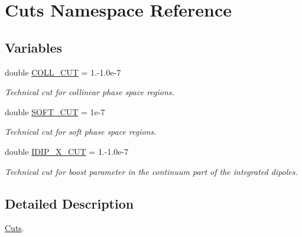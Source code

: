 \hypertarget{namespaceCuts}{}\section{Cuts Namespace Reference}
\label{namespaceCuts}
\subsection*{Variables}
\begin{DoxyCompactItemize}
\item 
\hypertarget{namespaceCuts_aac32d5f86a762f4aeb4f5f07a9accdba}{}double \hyperlink{namespaceCuts_aac32d5f86a762f4aeb4f5f07a9accdba}{C\+O\+L\+L\+\_\+\+C\+U\+T} = 1.-\/1.\+0e-\/7\label{namespaceCuts_aac32d5f86a762f4aeb4f5f07a9accdba}

\begin{DoxyCompactList}\small\item\em Technical cut for collinear phase space regions. \end{DoxyCompactList}\item 
\hypertarget{namespaceCuts_ab5b6f8f12059d55ffb68f56fecc10d65}{}double \hyperlink{namespaceCuts_ab5b6f8f12059d55ffb68f56fecc10d65}{S\+O\+F\+T\+\_\+\+C\+U\+T} = 1e-\/7\label{namespaceCuts_ab5b6f8f12059d55ffb68f56fecc10d65}

\begin{DoxyCompactList}\small\item\em Technical cut for soft phase space regions. \end{DoxyCompactList}\item 
\hypertarget{namespaceCuts_a4a86c8447ab5c08303431898f6faae38}{}double \hyperlink{namespaceCuts_a4a86c8447ab5c08303431898f6faae38}{I\+D\+I\+P\+\_\+\+X\+\_\+\+C\+U\+T} = 1.-\/1.\+0e-\/7\label{namespaceCuts_a4a86c8447ab5c08303431898f6faae38}

\begin{DoxyCompactList}\small\item\em Technical cut for boost parameter in the continuum part of the integrated dipoles. \end{DoxyCompactList}\end{DoxyCompactItemize}


\subsection{Detailed Description}
\hyperlink{namespaceCuts}{Cuts}. 